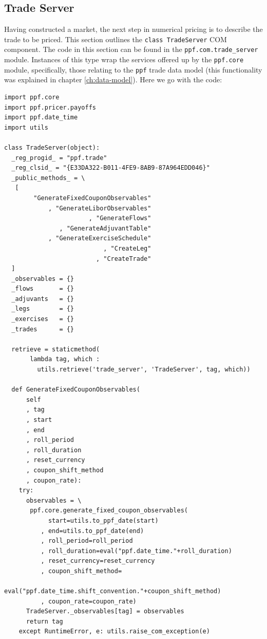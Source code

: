 \subsection{Trade Server}

Having constructed a market, the next step in numerical pricing is to
describe the trade to be priced. This section outlines the 
\verb|class TradeServer| COM component. The code in this section can be found in
the \verb|ppf.com.trade_server| module. Instances of this type wrap
the services offered up by the \verb|ppf.core| module, specifically,
those relating to the \verb|ppf| trade data model (this functionality
was explained in chapter \ref{ch:data-model}). Here we go with the code:
\begin{verbatim}
import ppf.core
import ppf.pricer.payoffs
import ppf.date_time
import utils

class TradeServer(object):
  _reg_progid_ = "ppf.trade"
  _reg_clsid_ = "{E33DA322-B011-4FE9-8AB9-87A964EDD046}"
  _public_methods_ = \
   [
        "GenerateFixedCouponObservables"
            , "GenerateLiborObservables"
                       , "GenerateFlows"
               , "GenerateAdjuvantTable"
            , "GenerateExerciseSchedule"
                           , "CreateLeg"
                         , "CreateTrade"
  ]
  _observables = {}
  _flows       = {}
  _adjuvants   = {}
  _legs        = {}
  _exercises   = {}
  _trades      = {}

  retrieve = staticmethod(
       lambda tag, which :
         utils.retrieve('trade_server', 'TradeServer', tag, which))

  def GenerateFixedCouponObservables(
      self
      , tag
      , start
      , end
      , roll_period
      , roll_duration
      , reset_currency
      , coupon_shift_method
      , coupon_rate):
    try:
      observables = \
       ppf.core.generate_fixed_coupon_observables(
            start=utils.to_ppf_date(start)
          , end=utils.to_ppf_date(end)
          , roll_period=roll_period
          , roll_duration=eval("ppf.date_time."+roll_duration)
          , reset_currency=reset_currency
          , coupon_shift_method=
              eval("ppf.date_time.shift_convention."+coupon_shift_method)
          , coupon_rate=coupon_rate)
      TradeServer._observables[tag] = observables
      return tag
    except RuntimeError, e: utils.raise_com_exception(e)


\end{verbatim}
